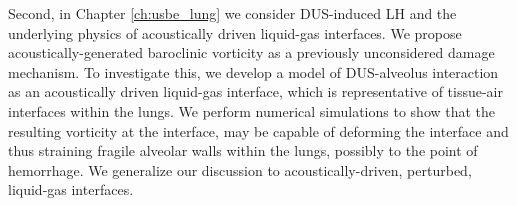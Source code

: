 Second, in Chapter \ref{ch:usbe_lung} we consider \ac{DUS}-induced
\ac{LH} and the underlying physics of acoustically driven liquid-gas
interfaces. We propose acoustically-generated baroclinic vorticity as
a previously unconsidered damage mechanism. To investigate this, we
develop a model of \ac{DUS}-alveolus interaction as an acoustically
driven liquid-gas interface, which is representative of tissue-air
interfaces within the lungs. We perform numerical simulations to show
that the resulting vorticity at the interface, may be capable of
deforming the interface and thus straining fragile alveolar walls
within the lungs, possibly to the point of hemorrhage. We generalize
our discussion to acoustically-driven, perturbed, liquid-gas
interfaces. 
